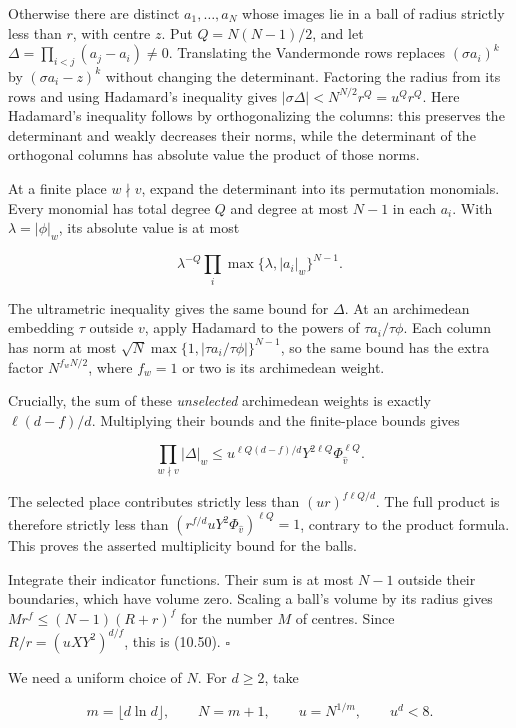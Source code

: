 \documentclass[
  11pt,
  a4paper,
]{article}
\begin{document}
Otherwise there are distinct \(a_1,\ldots,a_N\) whose images lie in a
ball of radius strictly less than \(r\), with centre \(z\). Put
\(Q=N(N-1)/2\), and let \(\Delta=\prod_{i<j}(a_j-a_i)\ne0\). Translating
the Vandermonde rows replaces \((\sigma a_i)^k\) by \((\sigma a_i-z)^k\)
without changing the determinant. Factoring the radius from its rows and
using Hadamard's inequality gives \(|\sigma\Delta|<N^{N/2}r^Q=u^Qr^Q\).
Here Hadamard's inequality follows by orthogonalizing the columns: this
preserves the determinant and weakly decreases their norms, while the
determinant of the orthogonal columns has absolute value the product of
those norms.

At a finite place \(w\nmid v\), expand the determinant into its
permutation monomials. Every monomial has total degree \(Q\) and degree
at most \(N-1\) in each \(a_i\). With \(\lambda=|\phi|_w\), its absolute
value is at most

\[
\lambda^{-Q}\prod_i\max\{\lambda,|a_i|_w\}^{N-1}.
\]

The ultrametric inequality gives the same bound for \(\Delta\). At an
archimedean embedding \(\tau\) outside \(v\), apply Hadamard to the
powers of \(\tau a_i/\tau\phi\). Each column has norm at most
\(\sqrt N\max\{1,|\tau a_i/\tau\phi|\}^{N-1}\), so the same bound has
the extra factor \(N^{f_wN/2}\), where \(f_w=1\) or two is its
archimedean weight.

Crucially, the sum of these \emph{unselected} archimedean weights is
exactly \(\ell(d-f)/d\). Multiplying their bounds and the finite-place
bounds gives

\[
\prod_{w\nmid v}|\Delta|_w
\le u^{\ell Q(d-f)/d}
Y^{2\ell Q}\Phi_{\widehat v}^{\ell Q}.
\]

The selected place contributes strictly less than \((ur)^{f\ell Q/d}\).
The full product is therefore strictly less than
\((r^{f/d}uY^2\Phi_{\widehat v})^{\ell Q}=1\), contrary to the product
formula. This proves the asserted multiplicity bound for the balls.

Integrate their indicator functions. Their sum is at most \(N-1\)
outside their boundaries, which have volume zero. Scaling a ball's
volume by its radius gives \(M r^f\le(N-1)(R+r)^f\) for the number \(M\)
of centres. Since \(R/r=(uXY^2)^{d/f}\), this is (10.50). \(\square\)

We need a uniform choice of \(N\). For \(d\ge2\), take

\[
m=\lfloor d\ln d\rfloor,\qquad N=m+1,\qquad
u=N^{1/m},\qquad u^d<8.
\tag{10.51}
\]
\end{document}
